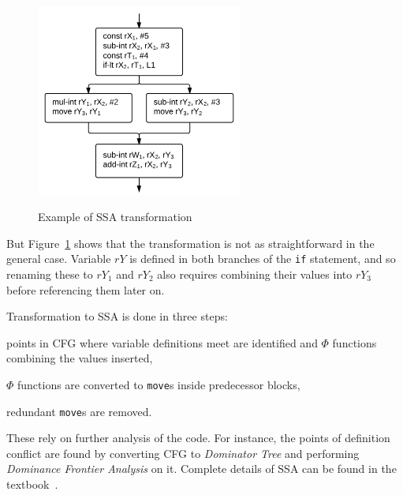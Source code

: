 \documentclass[12pt,twoside,notitlepage]{report}
\begin{document}
\begin{figure}
{  	\includegraphics[width=16pc]{figs/fig_implementation_ssa3.png}
  }
  \label{figure:Implementation_SSA3}

  \caption{Example of SSA transformation}
  \label{figure:Implementation_SSA}
\end{figure}

But Figure~\ref{figure:Implementation_SSA} shows that the transformation is not as straightforward in the general case. Variable $rY$ is defined in both branches of the \texttt{if} statement, and so renaming these to $rY_1$ and $rY_2$ also requires combining their values into $rY_3$ before referencing them later on. 

Transformation to SSA is done in three steps:
\begin{inparaenum}[(i)]
\item points in CFG where variable definitions meet are identified and $\Phi$ functions combining the values inserted,
\item $\Phi$ functions are converted to \texttt{move}s inside predecessor blocks,
\item redundant \texttt{move}s are removed.
\end{inparaenum}
These rely on further analysis of the code. For instance, the points of definition conflict are found by converting CFG to \emph{Dominator Tree} and performing \emph{Dominance Frontier Analysis} on it. Complete details of SSA can be found in the textbook~\cite{Appel:2003:MCI:599718}.
\end{document}

